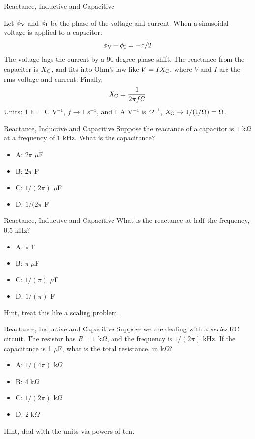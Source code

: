 \documentclass{beamer}
\begin{document}
\begin{frame}{Reactance, Inductive and Capacitive}
\begin{tcolorbox}[colback=white,colframe=black!40!black,title=Reactance and Capacitors]
\alert{Let $\phi_{\rm V}$ and $\phi_{\rm I}$ be the phase of the voltage and current.  When a sinusoidal voltage is applied to a capacitor:
\begin{equation}
\phi_{\rm V} - \phi_{\rm I} = -\pi/2
\end{equation}
The voltage lags the current by a 90 degree phase shift.  The reactance from the capacitor is $X_{\rm C}$, and fits into Ohm's law like $V = I X_{\rm C}$, where $V$ and $I$ are the rms voltage and current.  Finally,
\begin{equation}
X_{\rm C} = \frac{1}{2\pi f C}
\end{equation}
\footnotesize
Units: 1 F = C V$^{-1}$, $f \rightarrow 1$ s$^{-1}$, and 1 A V$^{-1}$ is $\Omega^{-1}$, $X_{\rm C} \rightarrow 1/(1/\Omega) = \Omega$.}
\end{tcolorbox}
\end{frame}

\begin{frame}{Reactance, Inductive and Capacitive}
Suppose the reactance of a capacitor is $1$ k$\Omega$ at a frequency of 1 kHz.  What is the capacitance?
\begin{itemize}
\item A: $2\pi$ $\mu$F
\item B: $2\pi$ F
\item C: $1/(2\pi)$ $\mu$F
\item D: $1/(2\pi$ F
\end{itemize}
\end{frame}

\begin{frame}{Reactance, Inductive and Capacitive}
What is the reactance at half the frequency, 0.5 kHz?
\begin{itemize}
\item A: $\pi$ F
\item B: $\pi$ $\mu$F
\item C: $1/(\pi)$ $\mu$F
\item D: $1/(\pi)$ F
\end{itemize}
\footnotesize
Hint, treat this like a scaling problem.
\end{frame}

\begin{frame}{Reactance, Inductive and Capacitive}
Suppose we are dealing with a \textit{series} RC circuit.  The resistor has $R = 1$ k$\Omega$, and the frequency is $1/(2\pi)$ kHz.  If the capacitance is 1 $\mu$F, what is the total resistance, in k$\Omega$?
\begin{itemize}
\item A: $1/(4\pi)$ k$\Omega$
\item B: 4 k$\Omega$
\item C: $1/(2\pi)$ k$\Omega$
\item D: 2 k$\Omega$
\end{itemize}
\footnotesize
Hint, deal with the units via powers of ten.
\end{frame}
\end{document}
